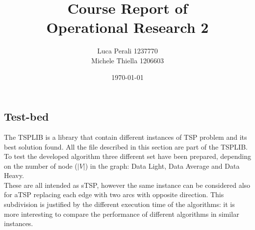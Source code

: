 \documentclass[11pt, english, openany]{report}
\title{Course Report of \\ Operational Research 2}
\author{Luca Perali 1237770 \\ Michele Thiella 1206603}
\date{\today}
\begin{document}

	
	

	\tableofcontents{}
	\clearpage

	
	
	
	
	
	
	
	
	\clearpage
	
	\begin{appendices}
		\chapter{Test-bed} \label{sec:testset}
		The TSPLIB \cite{TSPLIB} is a library that contain different instances of TSP problem and its best solution found. All the file described in this section are part of the TSPLIB. To test the developed algorithm three different set have been prepared, depending on the number of node ($|V|$) in the graph: Data Light, Data Average and Data Heavy.\\
		These are all intended as sTSP, however the same instance can be considered also for aTSP replacing each edge with two arcs with opposite direction. This subdivision is justified by the different execution time of the algorithms: it is more interesting to compare the performance of different algorithms in similar instances.
		

\end{appendices}
\end{document}
